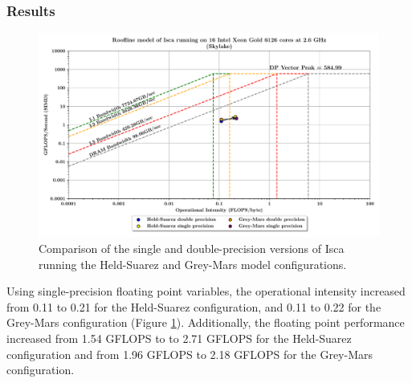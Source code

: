 \documentclass[a4paper,11pt]{report}
\begin{document}
\subsubsection{Results}
\begin{figure}[H]
\begin{center}
\includegraphics[width=\textwidth]{img/roofline_model_bluepebble_precision.pdf}
\caption[Roofline model comparing single and double-precision arithmetic]{Comparison of the single and double-precision versions of Isca running the Held-Suarez and Grey-Mars model configurations.}
\label{fig:roofline-opt}
\end{center}
\end{figure}
Using single-precision floating point variables, the operational intensity increased from 0.11 to 0.21 for the Held-Suarez configuration, and 0.11 to 0.22 for the Grey-Mars configuration (Figure \ref{fig:roofline-opt}). Additionally, the floating point performance increased from 1.54 GFLOPS to to 2.71 GFLOPS for the Held-Suarez configuration and from 1.96 GFLOPS to 2.18 GFLOPS for the Grey-Mars configuration.
\end{document}
